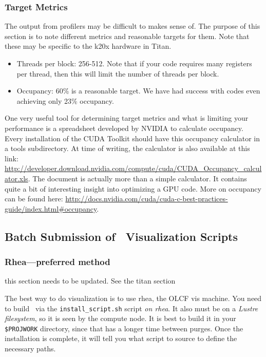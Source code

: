 \subsubsection{Target Metrics}
The output from profilers may be difficult to makes sense of.  The purpose of
this section is to note different metrics and reasonable targets for them.
Note that these may be specific to the k20x hardware in Titan.
\begin{itemize}
   \item Threads per block: 256-512.  Note that if your code requires many
      registers per thread, then this will limit the number of threads per block.
   \item Occupancy: 60\% is a reasonable target.  We have had success with codes
      even achieving only 23\% occupancy.  
\end{itemize}

One very useful tool for determining target metrics and what is limiting your
performance is a spreadsheet developed by NVIDIA to calculate occupancy.  Every
installation of the CUDA Toolkit should have this occupancy calculator in a
tools subdirectory.  At time of writing, the calculator is also available at
this link:
\url{http://developer.download.nvidia.com/compute/cuda/CUDA_Occupancy_calculator.xls}.
The document is actually  more than a simple calculator.  It contains quite a
bit of interesting insight into optimizing a GPU code.  More on occupancy can be
found here:
\url{http://docs.nvidia.com/cuda/cuda-c-best-practices-guide/index.html#occupancy}.

\subsection{Batch Submission of \yt\ Visualization Scripts}

\subsubsection{Rhea---preferred method}

{\color{red} this section needs to be updated.  See the titan section}

The best way to do visualization is to use rhea, the OLCF vis machine.
You need to build \yt\ via the {\tt install\_script.sh} script {\em on
rhea}.  It also must be on a {\em Lustre filesystem}, so it is seen by
the compute node.  It is best to build it in your {\tt \$PROJWORK} directory,
since that has a longer time between purges.  Once the installation is
complete, it will tell you what script to source to define the
necessary paths.

